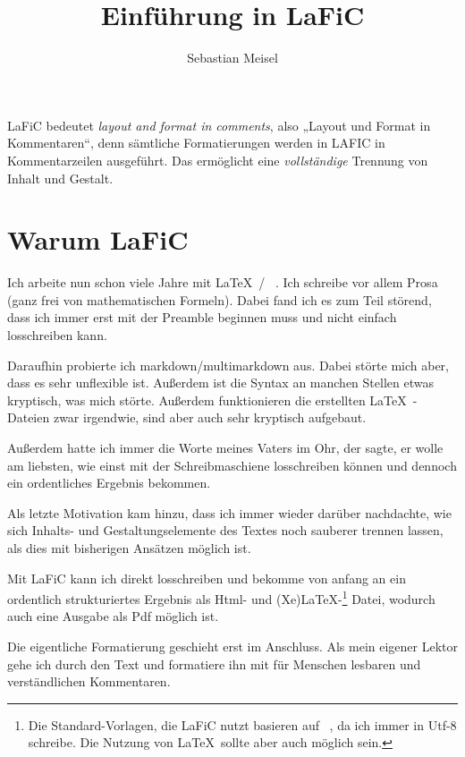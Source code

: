 \documentclass{scrartcl}
\title{Einführung in LaFiC}
\author{Sebastian Meisel}
\begin{document}
\maketitle


{LaFiC bedeutet \textit{layout and format in comments}, also „Layout
und Format in Kommentaren“, denn sämtliche Formatierungen
werden in LAFIC in Kommentarzeilen ausgeführt. Das
ermöglicht eine \emph{vollständige} Trennung von Inhalt und
Gestalt.\\}

\section{Warum LaFiC}

{Ich arbeite nun schon viele Jahre mit \LaTeX\  / \XeLaTeX\ . Ich
schreibe vor allem Prosa (ganz frei von mathematischen
Formeln). Dabei fand ich es zum Teil störend, dass ich immer
erst mit der Preamble beginnen muss und nicht einfach
losschreiben kann.\\}

{Daraufhin probierte ich markdown/multimarkdown aus. Dabei
störte mich aber, dass es sehr unflexible ist. Außerdem ist
die Syntax an manchen Stellen etwas kryptisch, was mich
störte. Außerdem funktionieren die erstellten \LaTeX\ -Dateien
zwar irgendwie, sind aber auch sehr kryptisch aufgebaut.\\}

{Außerdem hatte ich immer die Worte meines Vaters im Ohr, der
sagte, er wolle am liebsten, wie einst mit der
Schreibmaschiene losschreiben können und dennoch ein
ordentliches Ergebnis bekommen.\\}

{Als letzte Motivation kam hinzu, dass ich immer wieder
darüber nachdachte, wie sich Inhalts- und
Gestaltungselemente des Textes noch sauberer trennen lassen,
als dies mit bisherigen Ansätzen möglich ist.\\}

{Mit LaFiC kann ich direkt losschreiben und bekomme von
anfang an ein ordentlich strukturiertes Ergebnis als Html-
und (Xe)LaTeX-\footnote{Die Standard-Vorlagen, die LaFiC nutzt basieren auf \XeLaTeX\ , da ich immer in Utf-8 schreibe. Die Nutzung von \LaTeX\  sollte aber auch möglich sein.}\xspace Datei, wodurch auch eine Ausgabe als Pdf
möglich ist.\\}

{Die eigentliche Formatierung geschieht erst im
Anschluss. Als mein eigener Lektor gehe ich durch den Text
und formatiere ihn mit für Menschen lesbaren und
verständlichen Kommentaren.\\}
\end{document}
